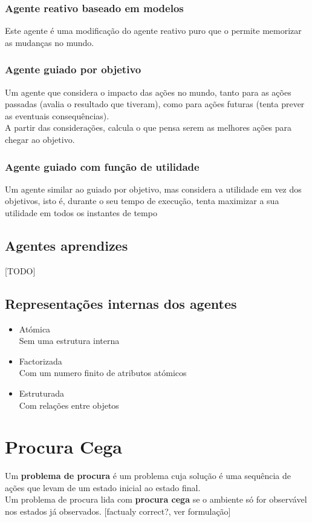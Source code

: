 \documentclass[]{report}
\begin{document}
\subsection{Agente reativo baseado em modelos}
Este agente é uma modificação do agente reativo puro que o permite memorizar as mudanças no mundo.
\subsection{Agente guiado por objetivo}
Um agente que considera o impacto das ações no mundo, tanto para as ações passadas (avalia o resultado que tiveram), como para ações futuras (tenta prever as eventuais consequências).\\
A partir das considerações, calcula o que pensa serem as melhores ações para chegar ao objetivo.
\subsection{Agente guiado com função de utilidade}
Um agente similar ao guiado por objetivo, mas considera a utilidade em vez dos objetivos, isto é, durante o seu tempo de execução, tenta maximizar a sua utilidade em todos os instantes de tempo
\section{Agentes aprendizes}
[TODO]
\section{Representações internas dos agentes}
\begin{itemize}
\item Atómica\\
Sem uma estrutura interna
\item Factorizada\\
Com um numero finito de atributos atómicos\\
\item Estruturada\\
Com relações entre objetos
\end{itemize}
\chapter{Procura Cega}
Um \textbf{problema de procura} é um problema cuja solução é uma sequência de ações que levam de um estado inicial ao estado final.\\
Um problema de procura lida com \textbf{procura cega} se o ambiente só for observável nos estados já observados. [factualy correct?, ver formulação]
\end{document}
